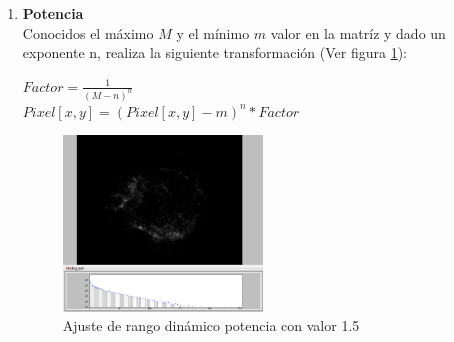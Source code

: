 \begin{enumerate}
		\item \textbf{Potencia}\\
		Conocidos el máximo $M$ y el mínimo $m$ valor en la matríz y dado
		un exponente n, realiza la siguiente transformación (Ver figura \ref{fig:HDRPOW}):
		\\
		\begin{center}
			{\large $Factor=\frac{1}{(M-n)^{n}}$}
			\\
			{\large $Pixel[x,y]=(Pixel[x,y]-m)^{n}*Factor$}
		\end{center}
			\begin{figure}[!htb]
				\centering
				\includegraphics[width=0.5\textwidth]{images/HDREQ/chandraPow1_5.PNG}
				\caption{\label{fig:HDRPOW}{\small Ajuste de rango dinámico potencia con valor 1.5}}
			\end{figure}



\end{enumerate}
